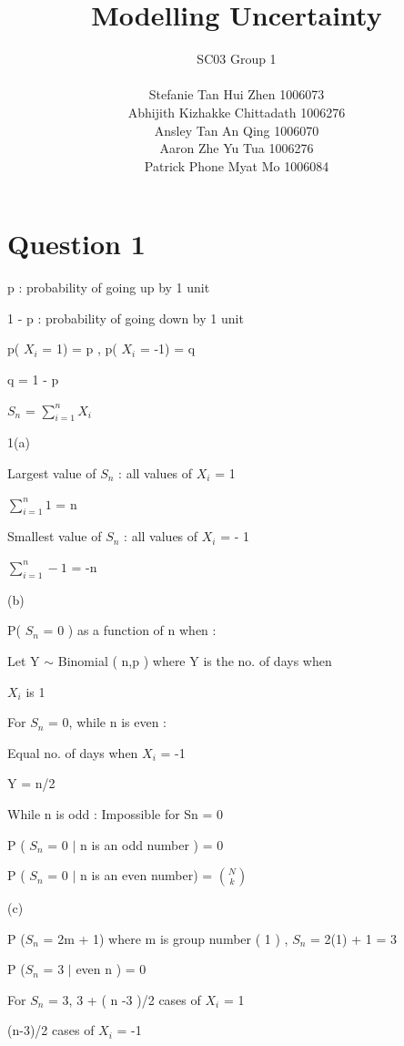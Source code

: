 \documentclass[a4paper,12pt]{article} %
\title{ Modelling Uncertainty}
\author{SC03 Group 1 \\\\ Stefanie Tan Hui Zhen 1006073 \\ Abhijith Kizhakke Chittadath 1006276 \\ Ansley Tan An Qing 1006070 \\ Aaron Zhe Yu Tua 1006276 \\ Patrick Phone Myat Mo 1006084 }
\date {}
\begin{document}
\maketitle %


\clearpage
\vspace{10mm}
\section{Question 1} %


\vspace{5mm}




\centerline {p : probability of going up by 1 unit}
\centerline {1 - p : probability of going down by 1 unit }
\vspace{5mm}
\centerline { p( $X_i$ = 1) = p ,  p( $X_i$ = -1) = q}
\centerline { q = 1 - p }



\centerline {$S_n$ = $\sum_{i=1}^{n} X_i$}

\vspace{2mm}

1(a) 
                         

\centerline {Largest value of $S_n$ : all values of $X_i$ = 1}
\centerline {  $\sum_{i=1}^{n} 1$ = n }
\vspace{5mm}

\centerline {Smallest value of $S_n$ : all values of $X_i$ = - 1}
\centerline {  $\sum_{i=1}^{n} -1$ = -n }



(b) 

\vspace{5mm}

\centerline {P( $S_n$ = 0 ) as a function of n when :}
\centerline {Let Y $\sim$ Binomial ( n,p ) where Y is the no. of days when}
\centerline {$X_i$ is 1}

\vspace{5mm}
\centerline {For $S_n$ = 0, while n is even :}
\centerline {Equal no. of days when $X_i$ = -1}
\centerline {Y = n/2}
\vspace{5mm}
\centerline {While n is odd : Impossible for Sn = 0}
\centerline{ P ( $S_n$ = 0 $\mid$ n is an odd number ) = 0 }
\centerline{ P ( $S_n$ = 0 $\mid$ n is an even number) = $N\choose k$}

(c)

\centerline {P ($S_n$ = 2m + 1) where m is group number ( 1 ) , $S_n$ = 2(1) + 1 = 3}
\centerline {P ($S_n$ = 3 $\mid$ even n ) = 0}
\centerline {For $S_n$ = 3, 3 + ( n -3 )/2 cases of $X_i$ = 1}
\centerline {(n-3)/2 cases of $X_i$ = -1}
\end{document}

